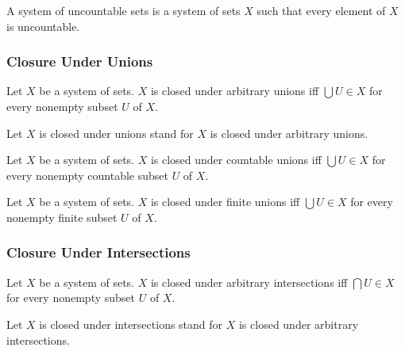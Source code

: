 \documentclass[10pt]{article}
\begin{document}
  \begin{forthel}
    \begin{definition}
      A system of uncountable sets is a system of sets $X$ such that every element of $X$ is uncountable.
    \end{definition}
  \end{forthel}


  \subsubsection*{Closure Under Unions}

  \begin{forthel}
    \begin{definition}
      Let $X$ be a system of sets.
      $X$ is closed under arbitrary unions iff $\bigcup U \in X$ for every nonempty subset $U$ of $X$.
    \end{definition}

    Let $X$ is closed under unions stand for $X$ is closed under arbitrary unions.
  \end{forthel}

  \begin{forthel}
    \begin{definition}
      Let $X$ be a system of sets.
      $X$ is closed under countable unions iff $\bigcup U \in X$ for every nonempty countable subset $U$ of $ X$.
    \end{definition}
  \end{forthel}

  \begin{forthel}
    \begin{definition}
      Let $X$ be a system of sets.
      $X$ is closed under finite unions iff $\bigcup U \in X$ for every nonempty finite subset $U$ of $X$.
    \end{definition}
  \end{forthel}


  \subsubsection*{Closure Under Intersections}

  \begin{forthel}
    \begin{definition}
      Let $X$ be a system of sets.
      $X$ is closed under arbitrary intersections iff $\bigcap U \in X$ for every nonempty subset $U$ of $X$.
    \end{definition}

    Let $X$ is closed under intersections stand for $X$ is closed under arbitrary intersections.
  \end{forthel}
\end{document}
